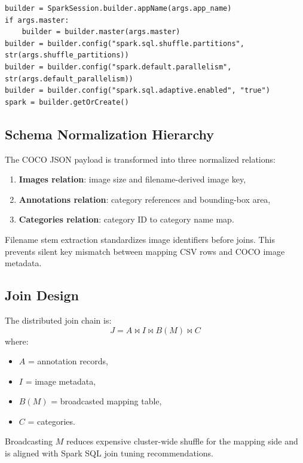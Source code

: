 \documentclass[journal,onecolumn]{IEEEtran}
\begin{document}
\begin{lstlisting}[style=pycode,caption={Spark session configuration for distributed execution semantics.}]
builder = SparkSession.builder.appName(args.app_name)
if args.master:
    builder = builder.master(args.master)
builder = builder.config("spark.sql.shuffle.partitions", str(args.shuffle_partitions))
builder = builder.config("spark.default.parallelism", str(args.default_parallelism))
builder = builder.config("spark.sql.adaptive.enabled", "true")
spark = builder.getOrCreate()
\end{lstlisting}

\subsection{Schema Normalization Hierarchy}
The COCO JSON payload is transformed into three normalized relations:
\begin{enumerate}
    \item \textbf{Images relation}: image size and filename-derived image key,
    \item \textbf{Annotations relation}: category references and bounding-box area,
    \item \textbf{Categories relation}: category ID to category name map.
\end{enumerate}

Filename stem extraction standardizes image identifiers before joins. This prevents silent key mismatch between mapping CSV rows and COCO image metadata.

\subsection{Join Design}
The distributed join chain is:
\begin{equation}
J = A \Join I \Join B(M) \Join C
\end{equation}
where:
\begin{itemize}
    \item $A$ = annotation records,
    \item $I$ = image metadata,
    \item $B(M)$ = broadcasted mapping table,
    \item $C$ = categories.
\end{itemize}

Broadcasting $M$ reduces expensive cluster-wide shuffle for the mapping side and is aligned with Spark SQL join tuning recommendations.
\end{document}

